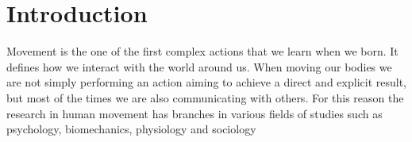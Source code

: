 \section{Introduction}
Movement is the one of the first complex actions that we learn when we born. It defines how we interact with the world around us. 
When moving our bodies we are not simply performing an action aiming to achieve a direct and explicit result, but most of the times we are also communicating with others.
For this reason the research in human movement has branches in various fields of studies such as psychology, biomechanics, physiology and sociology